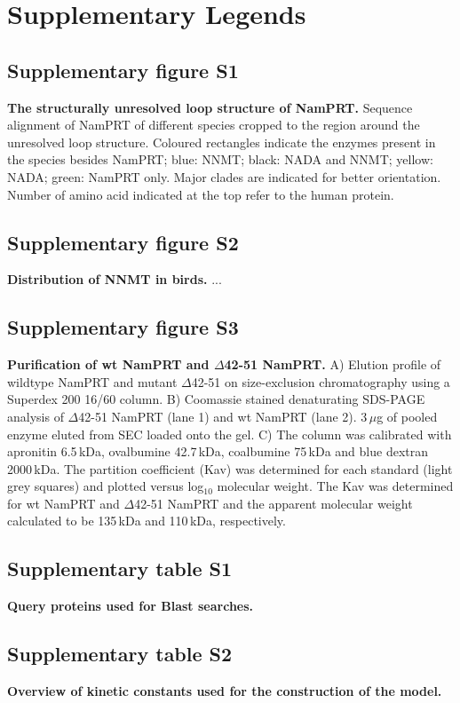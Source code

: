
\section{Supplementary Legends}

\subsection{Supplementary figure S1}

\textbf{The structurally unresolved loop structure of NamPRT.} Sequence alignment of NamPRT of different species cropped to the region around the unresolved loop structure. Coloured rectangles indicate the enzymes present in the species besides NamPRT; blue: NNMT; black: NADA and NNMT; yellow: NADA; green: NamPRT only. Major clades are indicated for better orientation. Number of amino acid indicated at the top refer to the human protein.


\subsection{Supplementary figure S2}

\textbf{Distribution of NNMT in birds.} ...


\subsection{Supplementary figure S3}

\textbf{Purification of wt NamPRT and $\Delta$42-51 NamPRT.} A) Elution profile of wildtype NamPRT and mutant $\Delta$42-51 on size-exclusion chromatography using a Superdex 200 16/60 column. B) Coomassie stained denaturating SDS-PAGE analysis of $\Delta$42-51 NamPRT (lane 1) and wt NamPRT (lane 2). 3\,$\mu$g of pooled enzyme eluted from SEC loaded onto the gel. C) The column was calibrated with apronitin 6.5\,kDa, ovalbumine 42.7\,kDa, coalbumine 75\,kDa and blue dextran 2000\,kDa. The partition coefficient (Kav) was determined for each standard (light grey squares) and plotted versus log$_{10}$ molecular weight. The Kav was determined for wt NamPRT and $\Delta$42-51 NamPRT and the apparent molecular weight calculated to be 135\,kDa and 110\,kDa, respectively.


\subsection{Supplementary table S1}

\textbf{Query proteins used for Blast searches.}


\subsection{Supplementary table S2}

\textbf{Overview of kinetic constants used for the construction of the model.}
